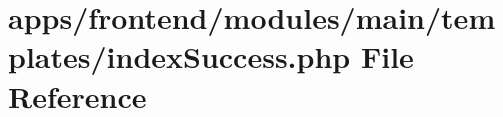 \hypertarget{frontend_2modules_2main_2templates_2index_success_8php}{\section{apps/frontend/modules/main/templates/index\-Success.php File Reference}
\label{frontend_2modules_2main_2templates_2index_success_8php}
}
